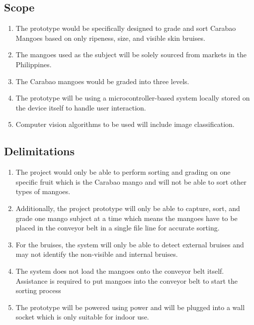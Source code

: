\subsection{Scope}
\begin{enumerate}
	\item The prototype would be specifically designed to grade and 
	sort Carabao Mangoes based on only ripeness, size, and visible skin bruises.
	
	\item The mangoes used as the subject will be solely sourced from markets in the Philippines.
	
	\item The Carabao mangoes would be graded into three levels.
	\item The prototype will be using a microcontroller-based system locally stored on 
	the device itself to handle user interaction.
	\item Computer vision algorithms to be used will include image classification.
\end{enumerate}

\subsection{Delimitations}
\begin{enumerate}
	\item The project would only be able to perform sorting and grading on one specific fruit 
	which is the Carabao mango and will not be able to sort other types of mangoes.
	
	\item Additionally, the project prototype will only be able to capture, sort, and grade one 
	mango subject at a time which means the mangoes have to be placed in the conveyor belt in
	a single file line for accurate sorting. 
	
	\item For the bruises, the system will only be able to detect external bruises and 
	may not identify the non-visible and internal bruises.
	\item The system does not load the mangoes onto the conveyor belt itself. 
	Assistance is required to put mangoes into the conveyor belt to start the sorting process
	\item The prototype will be powered using  power and will be plugged into 
	a wall socket which is only suitable for indoor use.
\end{enumerate}


